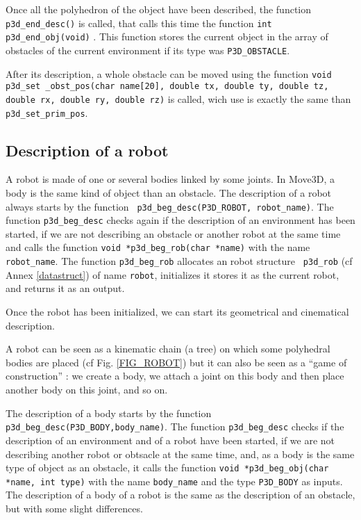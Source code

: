 
Once all the polyhedron of the object have been described, the
function {\tt p3d\_end\_desc()} is called, that
calls this time the function {\tt int p3d\_end\_obj(void)} . This
function stores the current object in the array of obstacles of the
current environment if its type was {\tt P3D\_OBSTACLE}. 

After its description, a whole obstacle can be moved using the
function {\tt void p3d\_set \_obst\_pos(char name[20], double tx,
double ty, double tz, double rx, double ry, double rz)}
 is called,
wich use is exactly the same than {\tt p3d\_set\_prim\_pos}.




\subsection{Description of a robot}


A robot is made of one or several bodies linked by some joints. In
Move3D, a body is the same kind of object than an obstacle. The
description of a robot always starts by the function {\tt
p3d\_beg\_desc(P3D\_ROBOT, robot\_name)}. The function {\tt p3d\_beg\_desc}
checks again if the description of an environment has been started, if we
are not describing an obstacle or another robot at the same time and
calls the function {\tt void *p3d\_beg\_rob(char *name)}
 with the name
{\tt robot\_name}. The function {\tt p3d\_beg\_rob} allocates an robot structure {\tt
p3d\_rob} (cf Annex \ref{datastruct}) of name {\tt robot}, initializes
it stores it as the current robot, and returns it as an output. 

Once the robot has been initialized, we can start its geometrical and
cinematical description.

A robot can be seen as a kinematic chain (a tree) on which some polyhedral bodies are
placed (cf Fig. \ref{FIG_ROBOT}) but it can also be seen as a ``game
of construction'' : we create a body, we attach a joint on this body
and then place another body on this joint, and so on.

The description of a body starts by the function {\tt
p3d\_beg\_desc(P3D\_BODY,body\_name)}. The function {\tt p3d\_beg\_desc}
checks if the description of an environment and of a robot have been
started, if we are not describing another robot or obtsacle at the
same time, and, as a body is the same type of object as an obstacle,
it calls the function {\tt void *p3d\_beg\_obj(char *name, int type)}
with the name {\tt body\_name} and the type {\tt P3D\_BODY} as inputs. The
description of a body of a robot is the same as the description of an
obstacle, but with some slight differences.


